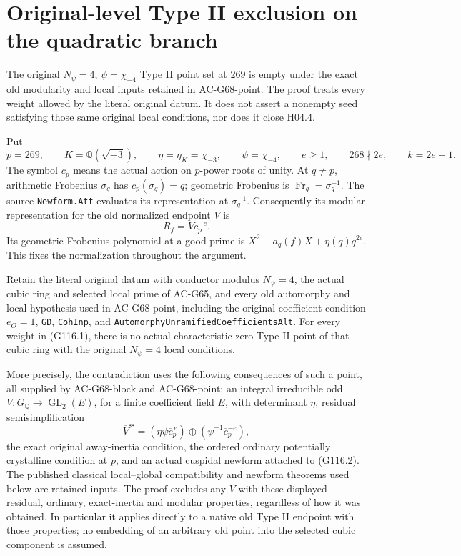 \section{Original-level Type II exclusion on the quadratic branch}
\label{sec:cubic-original-typeii-exclusion}

The original \(N_\psi=4\), \(\psi=\chi_{-4}\) Type II point set at \(269\) is empty
under the exact old modularity and local inputs retained in
AC-G68-point.  The proof treats every weight allowed by the literal
original datum.  It does not assert a nonempty seed satisfying those
same original local conditions, nor does it close H04.4.

Put
\[
 p=269,\qquad K=\mathbb Q(\sqrt{-3}),\qquad
 \eta=\eta_K=\chi_{-3},\qquad \psi=\chi_{-4},\qquad
 e\ge1,\qquad268\nmid2e,\qquad k=2e+1.
 \tag{G116.1}
\]
The symbol \(c_p\) means the actual action on \(p\)-power roots
of unity.  At \(q\ne p\), arithmetic Frobenius \(\sigma_q\) has
\(c_p(\sigma_q)=q\); geometric Frobenius is
\(\operatorname{Fr}_q=\sigma_q^{-1}\).
The source \texttt{Newform.Att} evaluates its representation at
\(\sigma_q^{-1}\).  Consequently its modular representation for
the old normalized endpoint \(V\) is
\[
                   R_f=V c_p^{-e}.
 \tag{G116.2}
\]
Its geometric Frobenius polynomial at a good prime is
\(X^2-a_q(f)X+\eta(q)q^{2e}\).
This fixes the normalization throughout the argument.

\begin{theorem}
\label{thm:ACG116exclusion}
Retain the literal original datum with conductor modulus
\(N_\psi=4\), the actual cubic ring and selected local prime of
AC-G65, and every old automorphy and local hypothesis used in
AC-G68-point, including the original coefficient condition
\(e_O=1\), \texttt{GD}, \texttt{CohInp}, and
\texttt{AutomorphyUnramifiedCoefficientsAlt}.
For every weight in (G116.1), there is no actual characteristic-zero
Type II point of that cubic ring with the original
\(N_\psi=4\) local conditions.

More precisely, the contradiction uses the following consequences
of such a point, all supplied by AC-G68-block and AC-G68-point:
an integral irreducible odd \(V:G_{\mathbb Q}\to\operatorname{GL}_2(E)\),
for a finite coefficient field \(E\), with determinant \(\eta\),
residual semisimplification
\[
 \overline V^{\mathrm{ss}}=
       (\eta\psi\overline c_p^{\,e})
          \oplus(\psi^{-1}\overline c_p^{-e}),
 \tag{G116.3}
\]
the exact original away-inertia condition, the ordered ordinary
potentially crystalline condition at \(p\), and an actual cuspidal
newform attached to (G116.2).  The published classical local--global
compatibility and newform theorems used below are retained inputs.
The proof excludes any \(V\) with these displayed residual,
ordinary, exact-inertia and modular properties, regardless of how
it was obtained.  In particular it applies directly to a native
old Type II endpoint with those properties; no embedding of an
arbitrary old point into the selected cubic component is assumed.
\end{theorem}

